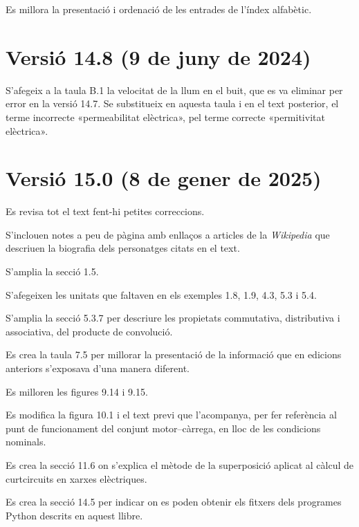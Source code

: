 Es millora la presentació i ordenació de les entrades de l'índex alfabètic.


\section*{Versió 14.8 (9 de juny de 2024)}

S'afegeix a la taula B.1 la velocitat de la llum en el buit, que es va eliminar per error en la versió 14.7. Se substitueix en aquesta taula i en el text posterior, el terme incorrecte «permeabilitat elèctrica», pel terme correcte «permitivitat elèctrica».


\section*{Versió 15.0 (8 de gener de 2025)}

Es revisa tot el text fent-hi petites correccions.

S'inclouen notes a peu de pàgina  amb enllaços a articles de la \textit{Wikipedia} que descriuen la biografia dels personatges citats en el text.

S'amplia la secció 1.5.

S'afegeixen les unitats que faltaven en els exemples 1.8, 1.9, 4.3, 5.3 i 5.4.

S'amplia la secció 5.3.7 per descriure les propietats commutativa, distributiva i associativa, del producte de convolució.

Es crea la taula 7.5 per millorar la presentació de la informació que en edicions anteriors s'exposava d'una manera diferent.

Es milloren les figures 9.14 i 9.15.

Es modifica la figura 10.1 i el text previ que l'acompanya, per fer referència al punt de funcionament del conjunt motor--càrrega, en lloc de  les condicions nominals.


Es crea la secció 11.6 on s'explica el mètode de la superposició aplicat al càlcul de curtcircuits en xarxes elèctriques.

Es crea la secció 14.5 per indicar on es poden obtenir els fitxers dels programes Python descrits en aquest llibre.

